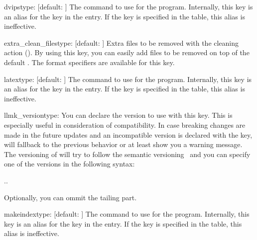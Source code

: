\documentclass{llmk-doc}
\begin{document}
\begin{confkey}{dvips}{type: }[default: ]
The command to use for the  program. Internally, this key is an
alias for the  key in the  entry. If the
 key is specified in the  table, this alias is
ineffective.
\end{confkey}

\begin{confkey}{extra\_clean\_files}{type: }
  [default: \code{[]}]
Extra files to be removed with the cleaning action (). By using
this key, you can easily add files to be removed on top of the default
. The format specifiers are available for this key.
\end{confkey}

\begin{confkey}{latex}{type: }[default: ]
The command to use for the  program. Internally, this key is an
alias for the  key in the  entry. If the
 key is specified in the  table, this alias is
ineffective.
\end{confkey}

\begin{confkey}{llmk\_version}{type: }
You can declare the  version to use with this key. This is
especially useful in consideration of compatibility. In case breaking changes
are made in the future updates and an incompatible version is declared with the
key,  will fallback to the previous behavior or at least show you a
warning message. The versioning of  will try to follow the semantic
versioning~\cite{semvar} and you can specify one of the versions in the
following syntax:
%
\begin{htcode}
..
\end{htcode}
%
Optionally, you can ommit the tailing  part.
\end{confkey}

\begin{confkey}{makeindex}{type: }[default: ]
The command to use for the  program. Internally, this key
is an alias for the  key in the  entry. If
the  key is specified in the  table, this alias is
ineffective.
\end{confkey}
\end{document}
